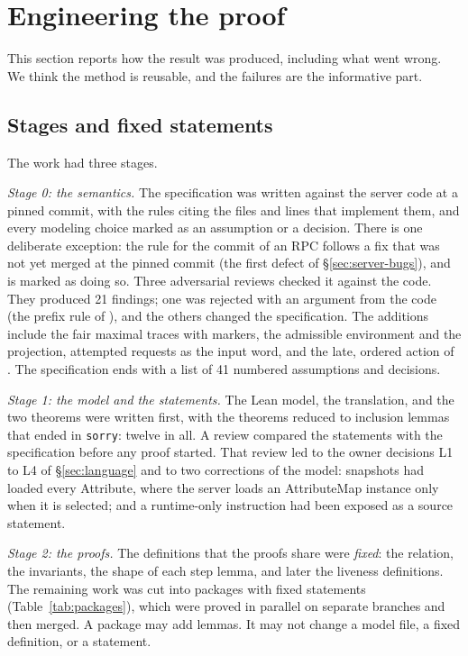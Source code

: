\section{Engineering the proof}
\label{sec:engineering}

This section reports how the result was produced, including what went
wrong. We think the method is reusable, and the failures are the
informative part.

\subsection{Stages and fixed statements}

The work had three stages.

\emph{Stage 0: the semantics.} The specification was written against the
server code at a pinned commit, with the rules citing the files and lines
that implement them, and every modeling choice marked as an assumption or
a decision. There is one deliberate exception: the rule for the commit of
an RPC follows a fix that was not yet merged at the pinned commit (the
first defect of \S\ref{sec:server-bugs}), and is marked as doing so. Three
adversarial reviews checked it against the code. They produced 21 findings;
one was rejected with an argument from the code (the prefix rule of
), and the others changed the specification. The
additions include the fair maximal traces with markers, the admissible
environment and the projection, attempted requests as the input word, and
the late, ordered  action of \Lang{}. The specification ends with a
list of 41 numbered assumptions and decisions.

\emph{Stage 1: the model and the statements.} The Lean model, the
translation, and the two theorems were written first, with the theorems
reduced to inclusion lemmas that ended in \texttt{sorry}: twelve in all.
A review compared the statements with the specification before any proof
started. That review led to the owner decisions L1 to L4 of
\S\ref{sec:language} and to two corrections of the model: snapshots had
loaded every Attribute, where the server loads an AttributeMap instance
only when it is selected; and a runtime-only instruction had been exposed
as a source statement.

\emph{Stage 2: the proofs.} The definitions that the proofs share were
\emph{fixed}: the relation, the invariants, the shape of each step lemma,
and later the liveness definitions. The remaining work was cut into
packages with fixed statements (Table~\ref{tab:packages}), which were
proved in parallel on separate branches and then merged. A package may add
lemmas. It may not change a model file, a fixed definition, or a statement.


